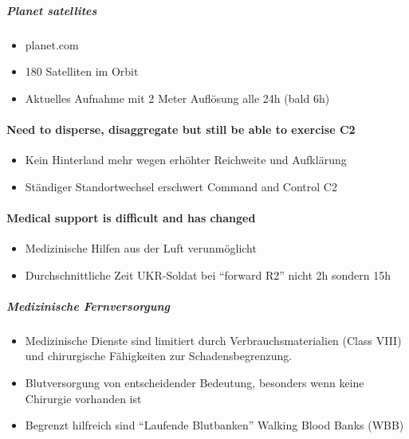 {}\documentclass[a4paper]{article}
\providecommand{\tightlist}{\setlength{\itemsep}{1mm}\setlength{\parskip}{1mm}}
\begin{document}
\subparagraph{Planet satellites}\label{planet-satellites}

\begin{itemize}
	\tightlist
	\item
	      planet.com
	\item
	      180 Satelliten im Orbit
	\item
	      Aktuelles Aufnahme mit 2 Meter Auflösung alle 24h (bald 6h)
\end{itemize}

\paragraph{Need to disperse, disaggregate but still be able to exercise
	C2}\label{need-to-disperse-disaggregate-but-still-be-able-to-exercise-c2}

\begin{itemize}
	\tightlist
	\item
	      Kein Hinterland mehr wegen erhöhter Reichweite und Aufklärung
	\item
	      Ständiger Standortwechsel erschwert Command and Control C2
\end{itemize}

\paragraph{Medical support is difficult and has
	changed}\label{medical-support-is-difficult-and-has-changed}

\begin{itemize}
	\tightlist
	\item
	      Medizinische Hilfen aus der Luft verunmöglicht
	\item
	      Durchschnittliche Zeit UKR-Soldat bei ``forward R2'' nicht 2h sondern
	      15h
\end{itemize}

\subparagraph{Medizinische
	Fernversorgung}\label{medizinische-fernversorgung}

\begin{itemize}
	\tightlist
	\item
	      Medizinische Dienste sind limitiert durch Verbrauchsmaterialien (Class
	      VIII) und chirurgische Fähigkeiten zur Schadensbegrenzung.
	\item
	      Blutversorgung von entscheidender Bedeutung, besonders wenn keine
	      Chirurgie vorhanden ist
	\item
	      Begrenzt hilfreich sind ``Laufende Blutbanken'' Walking Blood Banks
	      (WBB)
\end{itemize}
\end{document}
